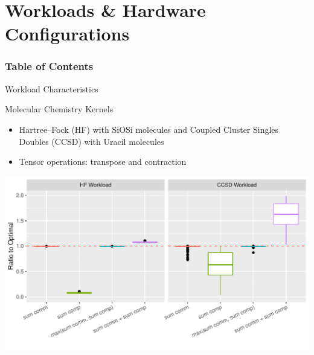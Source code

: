 \documentclass[mathserif,hyperref={pdfpagemode=FullScreen}]{beamer}
\begin{document}
\section{Workloads \& Hardware Configurations}
\begin{frame}
\frametitle{Table of Contents}
\tableofcontents[currentsection]
\end{frame}
\begin{frame}{Workload Characteristics}
\begin{block}{Molecular Chemistry Kernels}
\begin{itemize}
	\item 	Hartree--Fock (HF)  with SiOSi molecules and Coupled Cluster Singles Doubles (CCSD) with Uracil molecules
	\item Tensor operations: transpose and contraction
\end{itemize}
\end{block}

	\begin{block}{}
	\begin{center}
		\includegraphics[scale=0.5]{./diagrams/results/application_properties.pdf}
	\end{center}
	\end{block}

\end{frame}
\end{document}
